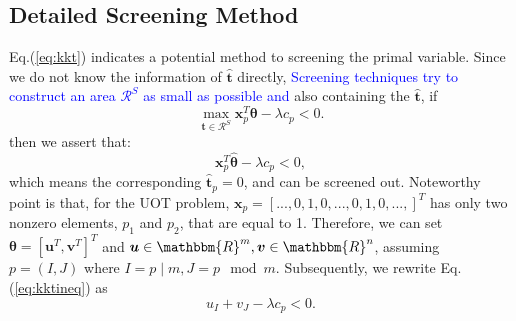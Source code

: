 \documentclass[twoside]{article}
\theoremstyle{plain}
\newcommand{\tranT}{T}
\newcommand{\R}{\mathbbm{R}}
\renewcommand{\vec}[1]{\bm{#1}}
\newcommand{\changeXS}[1]{\textcolor{blue}{#1}}
\begin{document}
\subsection{Detailed Screening Method}

Eq.(\ref{eq:kkt}) indicates a potential method to screening the primal variable. Since we do not know the information of $\hat{\vec{t}}$ directly, \changeXS{ Screening techniques try to construct an area $\mathcal{R}^{S}$  as small as possible and }also containing the $\hat{\vec{t}}$, if
\begin{equation}
\max_{\vec{t} \in \mathcal{R}^S} \vec{x}_p^{\tranT}\vec{\theta} -\lambda c_p < 0.
\end{equation}
then we assert that:
 \begin{equation}
 \vec{x}_p^{\tranT}\hat{\vec{\theta}} -\lambda c_p < 0,
 \label{eq:kktineq}
\end{equation}
which means the corresponding $\hat{\vec{t}}_p = 0$, and can be screened out. Noteworthy point is that, for the UOT problem, $\vec{x}_p = [...,0,1,0,...,0,1,0,...,]^{\tranT}$ has only two nonzero elements, $p_1$ and $p_2$, that are equal to 1. Therefore, we can set $\vec{\theta} = [\vec{u}^{\tranT},\vec{v}^{\tranT}]^{\tranT}$ and $\vec{u}\in\R^{m}, \vec{v}\in\R^{n}$, assuming $p=(I,J)$ where $I = p \mid m, J = p \mod m$. Subsequently, we rewrite Eq.(\ref{eq:kktineq}) as 
%
 \begin{equation}
u_{I} + v_{J}-\lambda c_p < 0.
\end{equation}
\end{document}
